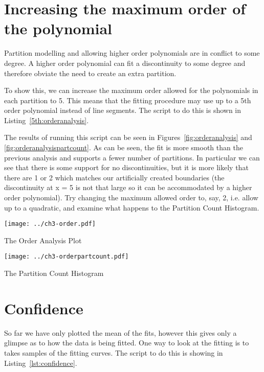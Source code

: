 \documentclass{tufte-handout}
\begin{document}
\section{Increasing the maximum order of the polynomial}

Partition modelling and allowing higher order polynomials are in
conflict to some degree. A higher order polynomial can fit a 
discontinuity to some degree and therefore obviate the need to 
create an extra partition. 

To show this, we can increase the maximum order allowed for the 
polynomials in each partition to 5.
This means that the fitting procedure may use up to a 5th order polynomial instead
of line segments. The script to do this is shown in Listing~\ref{5th:orderanalysis}.

\lstset{caption=Increasing the maximum order of the polynomials,label=5th:orderanalysis}


The results of running this script can be seen in
Figures~\ref{fig:orderanalysis} and \ref{fig:orderanalysispartcount}.
As can be seen, the fit is more smooth than the previous analysis and
 supports a fewer number of partitions. In particular we can see that there
is some support for no discontinuities, but it is more likely that
there are 1 or 2 which matches our artificially created boundaries
(the discontinuity at x = 5 is not that large so it can be
accommodated by a higher order polynomial). Try changing the
maximum allowed order to, say, 2, i.e. allow up to a quadratic, and examine
what happens to the Partition Count Histogram.

\begin{marginfigure}
\texttt{[image: ../ch3-order.pdf]}
\caption{The Order Analysis Plot}
\label{fig:orderanalysis}
\end{marginfigure}


\begin{marginfigure}
\texttt{[image: ../ch3-orderpartcount.pdf]}
\caption{The Partition Count Histogram}
\label{fig:orderanalysispartcount}
\end{marginfigure}

\section{Confidence}

So far we have only plotted the mean of the fits, however this gives only a glimpse
as to how the data is being fitted. One way to look at the fitting is to takes samples
of the fitting curves. The script to do this is showing in Listing~\ref{lst:confidence}.
\end{document}
